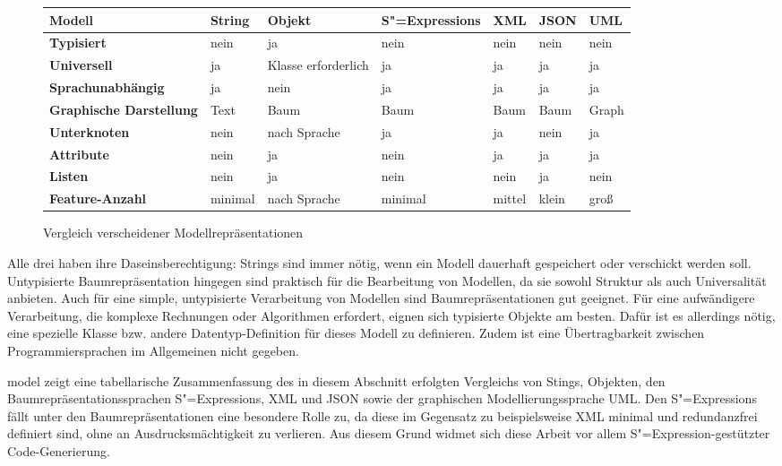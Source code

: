 \documentclass[a4paper, bibgerm]{book}
\newcommand\abb{}
\newcommand{\sexp}{S"=Expression}
\newcommand{\sexps}{S"=Expressions}
\begin{document}
\begin{figure}
  \centering
\begin{tabular}{|l|l|l|l|l|l|l|}\hline
\bf Modell                 & \bf String & \bf Objekt         & \bf \sexps{} & \bf XML & \bf JSON & \bf UML \\
\hline\hline
\bf Typisiert              & nein       & ja                 & nein         & nein    & nein     & nein    \\\hline
\bf Universell             & ja         & Klasse erforderlich& ja           & ja      & ja       & ja      \\\hline
\bf Sprachunabhängig       & ja         & nein               & ja           & ja      & ja       & ja      \\\hline
\bf Graphische Darstellung & Text       & Baum               & Baum         & Baum    & Baum     & Graph   \\\hline
\bf Unterknoten            & nein       & nach Sprache       & ja           & ja      & nein     & ja      \\\hline
\bf Attribute              & nein       & ja                 & nein         & ja      & ja       & ja      \\\hline
\bf Listen                 & nein       & ja                 & nein         & nein    & ja       & nein    \\\hline
\bf Feature-Anzahl         & minimal    & nach Sprache       & minimal      & mittel  & klein    & groß    \\\hline
\end{tabular}
  \caption{Vergleich verscheidener Modellrepräsentationen}
  \label{magicl:fig:model}
\end{figure}

Alle drei haben ihre Daseinsberechtigung: Strings sind immer nötig, wenn
ein Modell dauerhaft gespeichert oder verschickt werden
soll. Untypisierte Baumrepräsentation hingegen sind praktisch für die
Bearbeitung von Modellen, da sie sowohl Struktur als auch Universalität
anbieten. Auch für eine simple, untypisierte Verarbeitung von Modellen
sind Baumrepräsentationen gut geeignet. Für eine aufwändigere
Verarbeitung, die komplexe Rechnungen oder Algorithmen erfordert, eignen
sich typisierte Objekte am besten. Dafür ist es allerdings nötig, eine
spezielle Klasse bzw. andere Datentyp-Definition für dieses Modell zu
definieren. Zudem ist eine Übertragbarkeit zwischen Programmiersprachen
im Allgemeinen nicht gegeben.

\abb{model} zeigt eine tabellarische Zusammenfassung des in diesem
Abschnitt erfolgten Vergleichs von Stings, Objekten, den
Baumrepräsentationssprachen \sexps{}, XML und JSON sowie der graphischen
Modellierungssprache UML. Den \sexps{} fällt unter den
Baumrepräsentationen eine besondere Rolle zu, da diese im Gegensatz zu
beispielsweise XML minimal und redundanzfrei definiert sind, ohne an
Ausdrucksmächtigkeit zu verlieren. Aus diesem Grund widmet sich diese
Arbeit vor allem \sexp-gestützter Code-Generierung.
\end{document}
